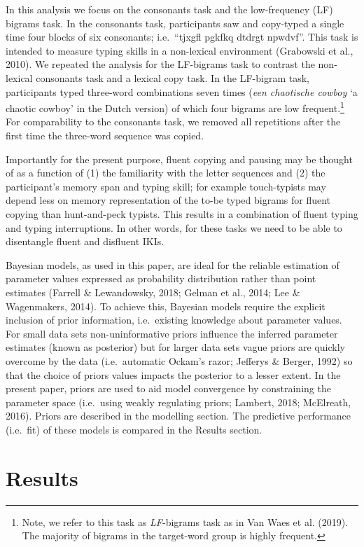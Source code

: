 \documentclass[
  english,
  man,mask,floatsintext]{apa7}
\begin{document}
In this analysis we focus on the consonants task and the low-frequency (LF) bigrams task. In the consonants task, participants saw and copy-typed a single time four blocks of six consonants; i.e.~\enquote{tjxgfl pgkfkq dtdrgt npwdvf}. This task is intended to measure typing skills in a non-lexical environment (Grabowski et al., 2010). We repeated the analysis for the LF-bigrams task to contrast the non-lexical consonants task and a lexical copy task. In the LF-bigram task, participants typed three-word combinations seven times (\emph{een chaotische cowboy} \enquote*{a chaotic cowboy} in the Dutch version) of which four bigrams are low frequent.\footnote{Note, we refer to this task as \emph{LF}-bigrams task as in Van Waes et al. (2019). The majority of bigrams in the target-word group is highly frequent.} For comparability to the consonants task, we removed all repetitions after the first time the three-word sequence was copied.

Importantly for the present purpose, fluent copying and pausing may be thought of as a function of (1) the familiarity with the letter sequences and (2) the participant's memory span and typing skill; for example touch-typists may depend less on memory representation of the to-be typed bigrams for fluent copying than hunt-and-peck typists. This results in a combination of fluent typing and typing interruptions. In other words, for these tasks we need to be able to disentangle fluent and disfluent IKIs.

Bayesian models, as used in this paper, are ideal for the reliable estimation of parameter values expressed as probability distribution rather than point estimates (Farrell \& Lewandowsky, 2018; Gelman et al., 2014; Lee \& Wagenmakers, 2014). To achieve this, Bayesian models require the explicit inclusion of prior information, i.e.~existing knowledge about parameter values. For small data sets non-uninformative priors influence the inferred parameter estimates (known as posterior) but for larger data sets vague priors are quickly overcome by the data (i.e.~automatic Ockam's razor; Jefferys \& Berger, 1992) so that the choice of priors values impacts the posterior to a lesser extent. In the present paper, priors are used to aid model convergence by constraining the parameter space (i.e.~using weakly regulating priors; Lambert, 2018; McElreath, 2016). Priors are described in the modelling section. The predictive performance (i.e.~fit) of these models is compared in the Results section.

\hypertarget{results}{%
\section{Results}\label{results}}
\end{document}
